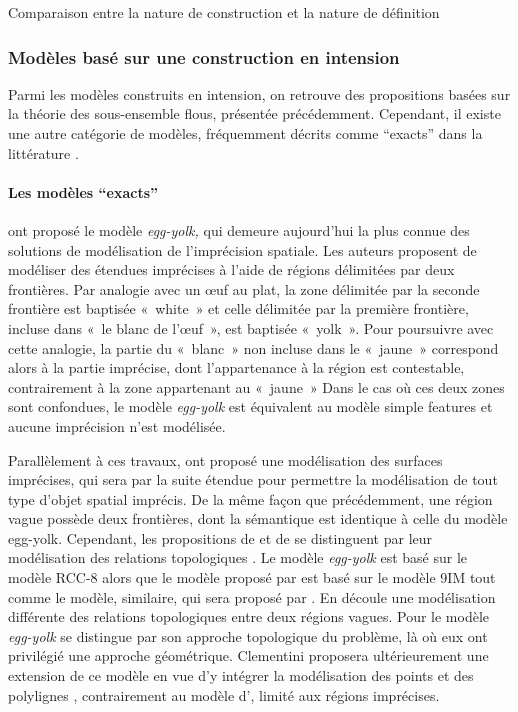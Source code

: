 \begin{table}
  \centering
  
  \caption{Comparaison entre la nature de construction et la nature de définition}
  \label{tab:ext_vs_int}
\end{table}

\subsubsection{Modèles basé sur une construction en intension}

Parmi les modèles construits en intension, on retrouve des
propositions basées sur la théorie des sous-ensemble flous, présentée
précédemment. Cependant, il existe une autre catégorie de modèles,
fréquemment décrits comme \enquote{exacts} dans la littérature
\autocite{Schneider2003,Bejaoui2009}.

\paragraph{Les modèles \enquote{exacts}}

\textcite{Cohn1996} ont proposé le modèle \emph{egg-yolk,} qui demeure
aujourd’hui la plus connue des solutions de modélisation de
l’imprécision spatiale. Les auteurs proposent de modéliser des
étendues imprécises à l’aide de régions délimitées par deux
frontières. Par analogie avec un œuf au plat, la zone délimitée par la
seconde frontière est baptisée « white » et celle délimitée par la
première frontière, incluse dans « le blanc de l’œuf », est baptisée
« yolk ». Pour poursuivre avec cette analogie, la partie du « blanc »
non incluse dans le « jaune » correspond alors à la partie imprécise,
\ie dont l’appartenance à la région est contestable, contrairement à
la zone appartenant au « jaune » Dans le cas où ces deux zones sont
confondues, le modèle \emph{egg-yolk} est équivalent au modèle simple
features et aucune imprécision n’est modélisée.

Parallèlement à ces travaux, \textcite{Clementini1996} ont proposé une
modélisation des surfaces imprécises, qui sera par la suite étendue
pour permettre la modélisation de tout type d’objet spatial
imprécis. De la même façon que précédemment, une région vague possède
deux frontières, dont la sémantique est identique à celle du modèle
egg-yolk. Cependant, les propositions de \textcite{Cohn1996} et de
\textcite{Clementini1996} se distinguent par leur modélisation des
relations topologiques \autocite{Cohn1996}. Le modèle \emph{egg-yolk}
est basé sur le modèle RCC-8 alors que le modèle proposé par
\textcite{Clementini1996} est basé sur le modèle 9IM tout comme le
modèle, similaire, qui sera proposé par \textcite{Erwig1997}. En
découle une modélisation différente des relations topologiques entre
deux régions vagues. Pour \textcite{Clementini1996} le modèle
\emph{egg-yolk} se distingue par son approche topologique du problème,
là où eux ont privilégié une approche géométrique. Clementini
proposera ultérieurement une extension de ce modèle en vue d’y
intégrer la modélisation des points et des polylignes
\autocite{Clementini2005,Clementini2008}, contrairement au modèle
d’\textcite{Erwig1997}, limité aux régions imprécises.


